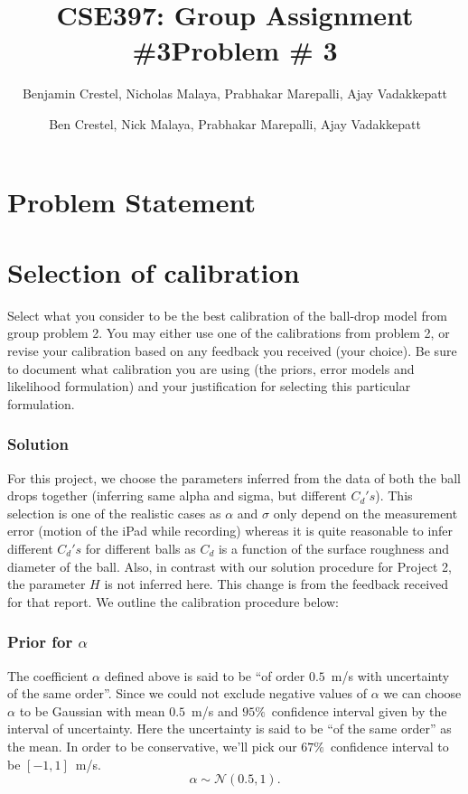 \documentclass{article}
\title{\bf{CSE397: Group Assignment \#3}}
\author{Benjamin Crestel, Nicholas Malaya, Prabhakar Marepalli, Ajay Vadakkepatt}
\begin{document}
\title{Problem \# 3}


\author{Ben Crestel, Nick Malaya, Prabhakar Marepalli, Ajay Vadakkepatt}

\maketitle

\section*{Problem Statement}


\section{Selection of calibration}

Select what you consider to be the best calibration of the ball-drop
model from group problem 2. You may either use one of the calibrations
from problem 2, or revise your calibration based on any feedback you
received (your choice). Be sure to document what calibration you are
using (the priors, error models and likelihood formulation) and your
justification for selecting this particular formulation.


\subsubsection*{Solution}

For this project, we choose the parameters inferred from the data
of both the ball drops together (inferring same alpha and sigma, but
different $C_{d}'s$). This selection is one of the realistic cases
as $\alpha$ and $\sigma$ only depend on the measurement error (motion
of the iPad while recording) whereas it is quite reasonable to infer
different $C_{d}'s$ for different balls as $C_{d}$ is a function
of the surface roughness and diameter of the ball. Also, in contrast
with our solution procedure for Project 2, the parameter $H$ is not
inferred here. This change is from the feedback received for that
report. We outline the calibration procedure below:


\subsubsection*{Prior for $\alpha$}

The coefficient $\alpha$ defined above is said to be ``of order
$0.5$~m/s with uncertainty of the same order''. Since we could
not exclude negative values of $\alpha$ we can choose $\alpha$ to
be Gaussian with mean $0.5$~m/s and $95\%$~confidence interval
given by the interval of uncertainty. Here the uncertainty is said
to be ``of the same order'' as the mean. In order to be conservative,
we'll pick our $67\%$~confidence interval to be $[-1,1]$~m/s.
\[
\alpha\sim\mathcal{N}(0.5,1).
\]
\end{document}
